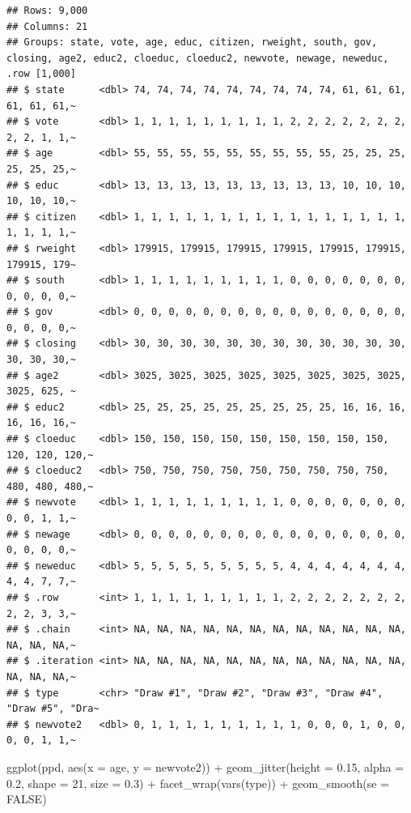 \documentclass[
]{book}
\newenvironment{Shaded}{\begin{snugshade}}{\end{snugshade}}
\newcommand{\AttributeTok}[1]{\textcolor[rgb]{0.77,0.63,0.00}{#1}}
\newcommand{\ConstantTok}[1]{\textcolor[rgb]{0.00,0.00,0.00}{#1}}
\newcommand{\DecValTok}[1]{\textcolor[rgb]{0.00,0.00,0.81}{#1}}
\newcommand{\FloatTok}[1]{\textcolor[rgb]{0.00,0.00,0.81}{#1}}
\newcommand{\FunctionTok}[1]{\textcolor[rgb]{0.00,0.00,0.00}{#1}}
\newcommand{\NormalTok}[1]{#1}
\newcommand{\SpecialCharTok}[1]{\textcolor[rgb]{0.00,0.00,0.00}{#1}}
\begin{document}
\begin{verbatim}
## Rows: 9,000
## Columns: 21
## Groups: state, vote, age, educ, citizen, rweight, south, gov, closing, age2, educ2, cloeduc, cloeduc2, newvote, newage, neweduc, .row [1,000]
## $ state      <dbl> 74, 74, 74, 74, 74, 74, 74, 74, 74, 61, 61, 61, 61, 61, 61,~
## $ vote       <dbl> 1, 1, 1, 1, 1, 1, 1, 1, 1, 2, 2, 2, 2, 2, 2, 2, 2, 2, 1, 1,~
## $ age        <dbl> 55, 55, 55, 55, 55, 55, 55, 55, 55, 25, 25, 25, 25, 25, 25,~
## $ educ       <dbl> 13, 13, 13, 13, 13, 13, 13, 13, 13, 10, 10, 10, 10, 10, 10,~
## $ citizen    <dbl> 1, 1, 1, 1, 1, 1, 1, 1, 1, 1, 1, 1, 1, 1, 1, 1, 1, 1, 1, 1,~
## $ rweight    <dbl> 179915, 179915, 179915, 179915, 179915, 179915, 179915, 179~
## $ south      <dbl> 1, 1, 1, 1, 1, 1, 1, 1, 1, 0, 0, 0, 0, 0, 0, 0, 0, 0, 0, 0,~
## $ gov        <dbl> 0, 0, 0, 0, 0, 0, 0, 0, 0, 0, 0, 0, 0, 0, 0, 0, 0, 0, 0, 0,~
## $ closing    <dbl> 30, 30, 30, 30, 30, 30, 30, 30, 30, 30, 30, 30, 30, 30, 30,~
## $ age2       <dbl> 3025, 3025, 3025, 3025, 3025, 3025, 3025, 3025, 3025, 625, ~
## $ educ2      <dbl> 25, 25, 25, 25, 25, 25, 25, 25, 25, 16, 16, 16, 16, 16, 16,~
## $ cloeduc    <dbl> 150, 150, 150, 150, 150, 150, 150, 150, 150, 120, 120, 120,~
## $ cloeduc2   <dbl> 750, 750, 750, 750, 750, 750, 750, 750, 750, 480, 480, 480,~
## $ newvote    <dbl> 1, 1, 1, 1, 1, 1, 1, 1, 1, 0, 0, 0, 0, 0, 0, 0, 0, 0, 1, 1,~
## $ newage     <dbl> 0, 0, 0, 0, 0, 0, 0, 0, 0, 0, 0, 0, 0, 0, 0, 0, 0, 0, 0, 0,~
## $ neweduc    <dbl> 5, 5, 5, 5, 5, 5, 5, 5, 5, 4, 4, 4, 4, 4, 4, 4, 4, 4, 7, 7,~
## $ .row       <int> 1, 1, 1, 1, 1, 1, 1, 1, 1, 2, 2, 2, 2, 2, 2, 2, 2, 2, 3, 3,~
## $ .chain     <int> NA, NA, NA, NA, NA, NA, NA, NA, NA, NA, NA, NA, NA, NA, NA,~
## $ .iteration <int> NA, NA, NA, NA, NA, NA, NA, NA, NA, NA, NA, NA, NA, NA, NA,~
## $ type       <chr> "Draw #1", "Draw #2", "Draw #3", "Draw #4", "Draw #5", "Dra~
## $ newvote2   <dbl> 0, 1, 1, 1, 1, 1, 1, 1, 1, 1, 0, 0, 0, 1, 0, 0, 0, 0, 1, 1,~
\end{verbatim}

\begin{Shaded}
\begin{Highlighting}[]
\FunctionTok{ggplot}\NormalTok{(ppd, }\FunctionTok{aes}\NormalTok{(}\AttributeTok{x =}\NormalTok{ age, }\AttributeTok{y =}\NormalTok{ newvote2)) }\SpecialCharTok{+} 
  \FunctionTok{geom\_jitter}\NormalTok{(}\AttributeTok{height =} \FloatTok{0.15}\NormalTok{, }\AttributeTok{alpha =} \FloatTok{0.2}\NormalTok{, }\AttributeTok{shape =} \DecValTok{21}\NormalTok{, }\AttributeTok{size =} \FloatTok{0.3}\NormalTok{) }\SpecialCharTok{+} 
  \FunctionTok{facet\_wrap}\NormalTok{(}\FunctionTok{vars}\NormalTok{(type)) }\SpecialCharTok{+} 
  \FunctionTok{geom\_smooth}\NormalTok{(}\AttributeTok{se =} \ConstantTok{FALSE}\NormalTok{)}
\end{Highlighting}
\end{Shaded}
\end{document}
